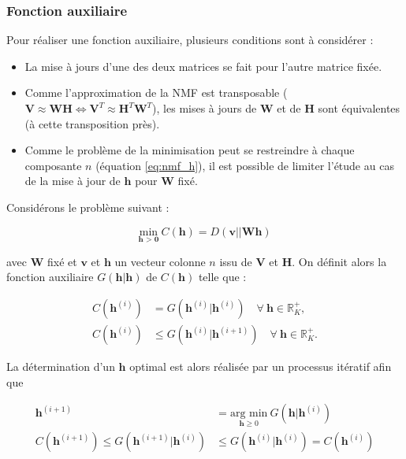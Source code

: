 \subsubsection{Fonction auxiliaire}\label{part:sub_fonction_aux}
Pour réaliser une fonction auxiliaire, plusieurs conditions sont à considérer : 

\begin{itemize}
\item La mise à jours d'une des deux matrices se fait pour l'autre matrice fixée.
\item Comme l'approximation de la NMF est transposable ($\mathbf{V} \approx \mathbf{WH} \Leftrightarrow \mathbf{V}^T \approx \mathbf{H}^T \mathbf{W}^T$), les mises à jours de $\mathbf{W}$ et de $\mathbf{H}$ sont équivalentes (à cette transposition près). 
\item Comme le problème de la minimisation peut se restreindre à chaque composante $n$ (équation \ref{eq:nmf_h}), il est possible de limiter l'étude au cas de la mise à jour de $\mathbf{h}$ pour $\mathbf{W}$ fixé. 
\end{itemize}

Considérons le problème suivant :  

\begin{equation}\label{eq:costFunctionMM}
\underset{\textbf{h > 0}}{\text{min}}~C(\mathbf{h}) = D(\mathbf{v} \vert\vert \mathbf{Wh})
\end{equation}

avec $\mathbf{W}$ fixé et $\mathbf{v}$ et $\mathbf{h}$ un vecteur colonne $n$ issu de $\mathbf{V}$ et $ \mathbf{H}$. On définit alors la fonction auxiliaire $G(\mathbf{h}\vert \mathbf{h})$ de $C(\mathbf{h})$ telle que : 

\begin{subequations}\label{eqs:conditionAux}
\begin{align}
C(\mathbf{h}^{\left(i\right)}) &= G(\mathbf{h}^{(i)}\vert \mathbf{h}^{(i)}) \quad \forall~\mathbf{h} \in \mathbb{R}^+_K,\\
C(\mathbf{h}^{(i)}) &\leq G(\mathbf{h}^{(i)} \vert \mathbf{h}^{(i+1)}) \quad \forall~\mathbf{h} \in \mathbb{R}^+_K.
\end{align}
\end{subequations}

La détermination d'un $\mathbf{h}$ optimal est alors réalisée par un processus itératif afin que 

\begin{subequations}\label{eqs:conditionAux}
\begin{align}
\textbf{h}^{(i+1)} &= \underset{\textbf{h} \geq 0}{\text{arg min}}~ G(\textbf{h}\vert \textbf{h}^{(i)})\\
C(\mathbf{h}^{(i+1)}) \leq G(\textbf{h}^{(i+1)}\vert\mathbf{h}^{(i)}) &\leq G(\textbf{h}^{(i)}\vert\mathbf{h}^{(i)}) = C(\mathbf{h}^{(i)})\label{eq:monotonie}
\end{align}
\end{subequations}

